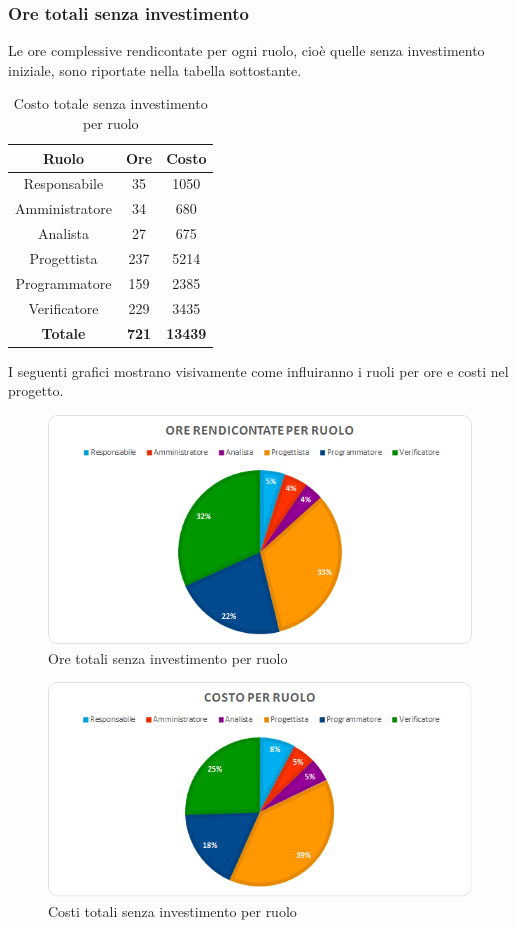 \subsubsection{Ore totali senza investimento}
Le ore complessive rendicontate per ogni ruolo, cioè quelle senza investimento iniziale, sono riportate nella tabella sottostante.
\begin{table}[H]
	\centering
	\begin{tabular}{|c|c|c|}
		\hline
		\textbf{Ruolo} &
		\textbf{Ore} &
		\textbf{Costo} \\
		\hline
		Responsabile & 35 & 1050\\
		\hline
		Amministratore & 34 & 680\\
		\hline
		Analista & 27 & 675\\
		\hline
		Progettista & 237 & 5214 \\
		\hline
		Programmatore & 159 & 2385 \\
		\hline
		Verificatore & 229 & 3435\\
		\hline
		\textbf{Totale} & \textbf{721} & \textbf{13439} \\
		\hline
	\end{tabular}
	\caption{Costo totale senza investimento per ruolo}
\end{table}
I seguenti grafici mostrano visivamente come influiranno i ruoli per ore e costi nel progetto.
\begin{figure}[H]
	\centering
	\includegraphics[width=14cm]{img_peconomico/TOT2_OR_R.png}
	\caption{Ore totali senza investimento per ruolo}
\end{figure}
\begin{figure}[H]
	\centering
	\includegraphics[width=14cm]{img_peconomico/TOT2_CR_R.png}
	\caption{Costi totali senza investimento per ruolo}
\end{figure}





